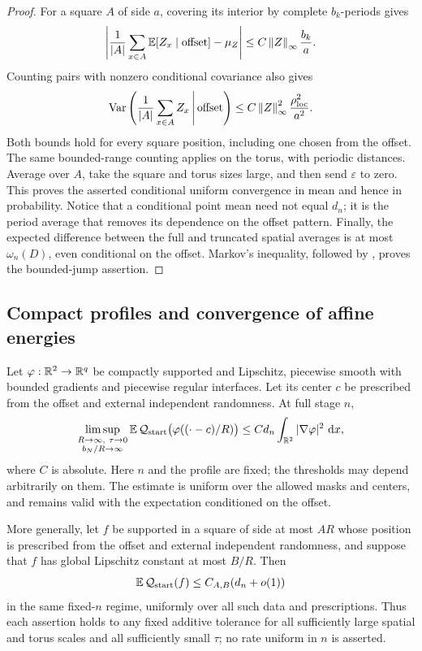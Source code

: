 \begin{proof}
For a square $A$ of side $a$, covering its interior by complete
$b_k$-periods gives
\[
 \left|\frac1{|A|}\sum_{x\in A}
       \mathbb E[Z_x\mid\text{offset}]-\mu_Z\right|
 \leq C\left\lVert Z\right\rVert_\infty\frac{b_k}{a}.
\]
Counting pairs with nonzero conditional covariance also gives
\[
 \operatorname{Var}\left(\frac1{|A|}\sum_{x\in A}Z_x
                  \,\middle|\,\text{offset}\right)
 \leq C\left\lVert Z\right\rVert_\infty^2\frac{\rho_{\mathrm{loc}}^2}{a^2}.
\]
Both bounds hold for every square position, including one chosen
from the offset. The same bounded-range counting applies on the
torus, with periodic distances. Average
 over $A$, take the square and
torus sizes large, and then send $\varepsilon$ to zero. This proves
the asserted conditional uniform convergence in mean and hence in
probability. Notice that a conditional point mean need not equal
$d_n$; it is the period average that removes its dependence on the
offset pattern.
Finally, the expected difference between the full and truncated
spatial averages is at most $\omega_n(D)$, even conditional on the
offset. Markov's inequality, followed by
, proves the bounded-jump assertion.
\end{proof}

\subsection{Compact profiles and convergence of affine energies}

\begin{proposition}
\label{screen:profiles}
Let $\varphi:\mathbb R^2\to\mathbb R^q$ be compactly supported and Lipschitz,
piecewise smooth with bounded gradients and piecewise regular
interfaces. Let its center $c$ be prescribed from the offset and
external independent randomness. At full stage $n$,
\begin{equation}
 \limsup_{\substack{R\to\infty,\ \tau\to0\\b_N/R\to\infty}}
 \E\,\mathcal Q_{\mathrm{start}}
       \bigl(\varphi((\cdot-c)/R)\bigr)
 \leq C d_n\int_{\R^2}|\nabla\varphi|^2\,\dd x,
 \label{screen:profile-bound}
\end{equation}
where $C$ is absolute. Here $n$ and the profile are fixed; the
thresholds may depend arbitrarily on them. The estimate is uniform
over the allowed masks and centers, and remains valid with the
expectation conditioned on the offset.

More generally, let $f$ be supported in a square of side at most
$A R$ whose position is prescribed from the offset and external
independent randomness, and suppose that $f$ has global Lipschitz
constant at most $B/R$. Then
\begin{equation}
 \mathbb E\,\mathcal Q_{\mathrm{start}}(f)
       \leq C_{A,B}(d_n+o(1))
 \label{screen:rough-profile}
\end{equation}
in the same fixed-$n$ regime, uniformly over all such data and
prescriptions. Thus each assertion holds to any fixed additive
tolerance for all sufficiently large spatial and torus scales and
all sufficiently small $\tau$; no rate uniform in $n$ is asserted.
\end{proposition}

